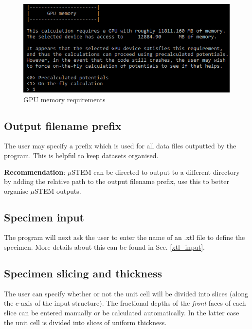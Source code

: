 \documentclass[12pt,a4paper]{article}
\begin{document}
\begin{figure}[!h]
\begin{center}
\includegraphics[scale=0.75]{Figures/GPU_memory.png}
\caption{GPU memory requirements}
\label{fig:GPU_memory}
\end{center}
\end{figure}

\subsection{Output filename prefix}

The user may specify a prefix which is used for all data files outputted by the program.
This is helpful to keep datasets organised.

{\bf Recommendation}: $\mu$STEM can be directed to output to a different directory by adding the relative path to the output filename prefix, use this to better organise $\mu$STEM outputs.

\subsection{Specimen input}

The program will next ask the user to enter the name of an .xtl file to define the specimen.
More details about this can be found in Sec. \ref{xtl_input}.

\subsection{Specimen slicing and thickness \label{sec:thickness}}

The user can specify whether or not the unit cell will be divided into slices (along the c-axis of the input structure).
The fractional depths of the \emph{front} faces of each slice can be entered manually or be calculated automatically.
In the latter case the unit cell is divided into slices of uniform thickness.
\end{document}
